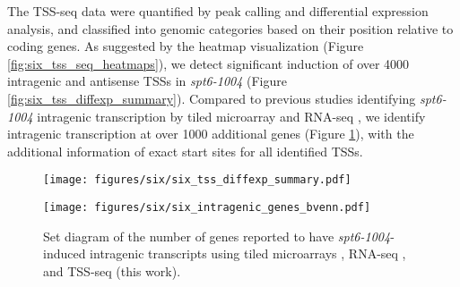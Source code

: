 The TSS-seq data were quantified by peak calling and differential expression analysis, and classified into genomic categories based on their position relative to coding genes.
As suggested by the heatmap visualization (Figure \ref{fig:six_tss_seq_heatmaps}), we detect significant induction of over 4000 intragenic and antisense TSSs in \textit{spt6-1004} (Figure \ref{fig:six_tss_diffexp_summary}).
Compared to previous studies identifying \textit{spt6-1004} intragenic transcription by tiled microarray and RNA-seq \citep{cheung2008, uwimana2017}, we identify intragenic transcription at over 1000 additional genes (Figure \ref{fig:six_intragenic_genes_bvenn}), with the additional information of exact start sites for all identified TSSs.
\begin{figure}[H]
    \centering
    \begin{minipage}[t]{2.875in}
        \centering
        \texttt{[image: figures/six/six\_tss\_diffexp\_summary.pdf]}
        \caption[Bar plot of the number of TSS-seq peaks in various genomic classes detected as differentially expressed in \textit{spt6-1004} versus wild-type.]{Bar plot of the number of TSS-seq peaks detected as differentially expressed in \textit{spt6-1004} versus wild-type, both after 80 minutes at 37\textdegree C. The height of each bar is proportional to the total number of peaks in the category, including those not found to be significantly differentially expressed.}
        \label{fig:six_tss_diffexp_summary}
    \end{minipage}\hfill
    \begin{minipage}[t]{2.875in}
        \centering
        \texttt{[image: figures/six/six\_intragenic\_genes\_bvenn.pdf]}
        \caption[Set diagram of the number of genes with \textit{spt6-1004}-induced intragenic transcripts reported by studies using tiled microarrays, RNA-seq, and our TSS-seq data.]{Set diagram of the number of genes reported to have \textit{spt6-1004}-induced intragenic transcripts using tiled microarrays \citep{cheung2008}, RNA-seq \citep{uwimana2017}, and TSS-seq (this work).}
        \label{fig:six_intragenic_genes_bvenn}
    \end{minipage}
\end{figure}

